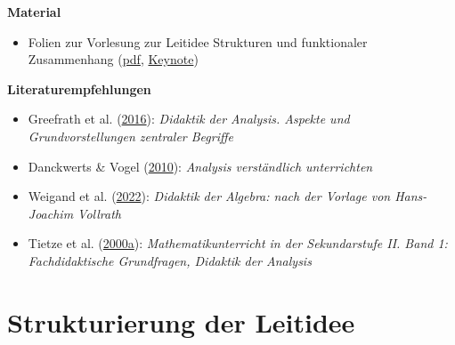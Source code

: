 \documentclass[
]{scrbook}
\providecommand{\tightlist}{%
  \setlength{\itemsep}{0pt}\setlength{\parskip}{0pt}}
\renewenvironment{quote}{
  \list{}{
	\leftmargin0.2cm   %
    \rightmargin\leftmargin
      	\def\FrameCommand
    {%
        {\color{quoteColor}\vrule width 2pt}%
        \hspace{0pt}%
    }%
    \MakeFramed{\advance \hsize -\width \FrameRestore}    \color{quoteColor}
    }
  \item\relax
}
{\endlist\color{black}\endMakeFramed}
\theoremstyle{definition}
\theoremstyle{definition}
\theoremstyle{definition}
\theoremstyle{definition}
\theoremstyle{remark}
\begin{document}
\begin{quote}
\textbf{Material}

\begin{itemize}
\tightlist
\item
  Folien zur Vorlesung zur Leitidee Strukturen und funktionaler Zusammenhang (\href{files/Stoffdidaktik-WiSe2223-Kap13.pdf}{pdf}, \href{files/Stoffdidaktik-WiSe2223-Kap13.key}{Keynote})
\end{itemize}

\textbf{Literaturempfehlungen}

\begin{itemize}
\tightlist
\item
  Greefrath et al. (\protect\hyperlink{ref-Greefrath2016}{2016}): \emph{Didaktik der Analysis. Aspekte und Grundvorstellungen zentraler Begriffe}
\item
  Danckwerts \& Vogel (\protect\hyperlink{ref-Danckwerts2010}{2010}): \emph{Analysis verständlich unterrichten}
\item
  Weigand et al. (\protect\hyperlink{ref-Weigand2022}{2022}): \emph{Didaktik der Algebra: nach der Vorlage von Hans-Joachim Vollrath}
\item
  Tietze et al. (\protect\hyperlink{ref-Tietze:2000a}{2000a}): \emph{Mathematikunterricht in der Sekundarstufe II. Band 1: Fachdidaktische Grundfragen, Didaktik der Analysis}
\end{itemize}
\end{quote}

\hypertarget{strukturierung-der-leitidee-funktionaler-zusammenhang}{%
\section{Strukturierung der Leitidee}\label{strukturierung-der-leitidee-funktionaler-zusammenhang}}
\end{document}
